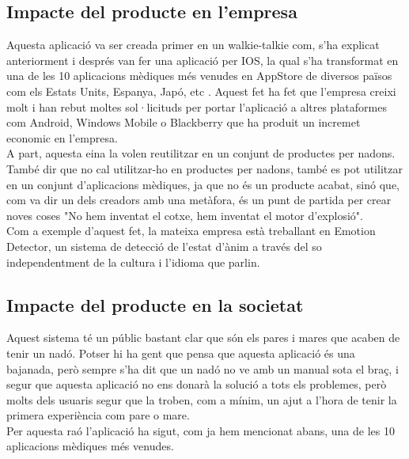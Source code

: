 \documentclass[11pt,a4paper]{article}
\begin{document}
\subsection{\textsf{Impacte del producte en l'empresa}}
\label{impacte-empresa}
Aquesta aplicació va ser creada primer en un walkie-talkie com, s'ha explicat anteriorment i després van fer una aplicació per IOS, la qual s'ha transformat en una de les 10 aplicacions mèdiques més venudes en AppStore de diversos països com els Estats Units, Espanya, Japó, etc \cite{elmundo}. Aquest fet ha fet que l'empresa creixi molt i han rebut moltes sol·licituds per portar l'aplicació a altres plataformes com Android, Windows Mobile o Blackberry que ha produit un incremet economic en l'empresa.\\
A part, aquesta eina la volen reutilitzar en un conjunt de productes per nadons. També dir que no cal utilitzar-ho en productes per nadons, també es pot utilitzar en un conjunt d'aplicacions mèdiques, ja que no és un producte acabat, sinó que, com va dir un dels creadors amb una metàfora, és un punt de partida per crear noves coses "No hem inventat el cotxe, hem inventat el motor d'explosió".\\ Com a exemple d'aquest fet, la mateixa empresa està treballant en Emotion Detector, un sistema de detecció de l'estat d'ànim a través del so independentment de la cultura i l'idioma que parlin.

\subsection{\textsf{Impacte del producte en la societat}}
\label{impacte-societat}
Aquest sistema té un públic bastant clar que són els pares i mares que acaben de tenir un nadó. Potser hi ha gent que pensa que aquesta aplicació és una bajanada, però sempre s'ha dit que un nadó no ve amb un manual sota el braç, i segur que aquesta aplicació no ens donarà la solució a tots els problemes, però molts dels usuaris segur que la troben, com a mínim, un ajut a l'hora de tenir la primera experiència com pare o mare.\\
Per aquesta raó l'aplicació ha sigut, com ja hem mencionat abans, una de les 10 aplicacions mèdiques més venudes.
\end{document}
